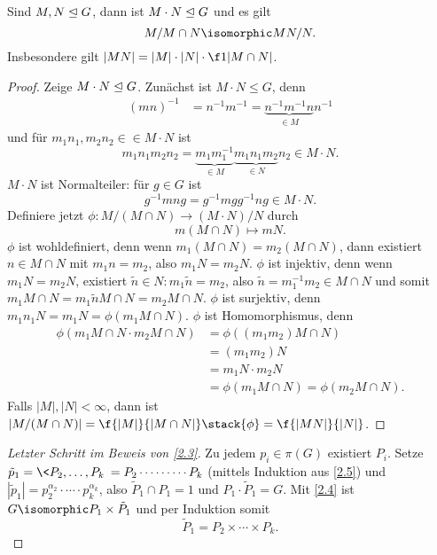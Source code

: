 \begin{lem} \label{2.5}
	Sind $M, N \trianglelefteq G$, dann ist $M\cdot N \trianglelefteq G$ und es gilt
	\[
		M / M\cap N
		\isomorphic
		MN / N.
	\]
	Insbesondere gilt $|MN| = |M|\cdot|N| \cdot \f 1{|M \cap N|}$.
	\begin{proof}
		Zeige $M\cdot N \trianglelefteq G$.
		Zunächst ist $M \cdot N \le G$, denn
		\begin{align*}
			(mn)^{-1} &= n^{-1} m^{-1}
			= \underbrace{n^{-1}m^{-1}n}_{\in M} n^{-1}
		\end{align*}
		und für $m_1n_1, m_2n_2 \in \in M\cdot N$ ist
		\[
			m_1 n_1 m_2 n_2
			= \underbrace{m_1 m_1^{-1}}_{\in M} \underbrace{m_1 n_1 m_2}_{\in N} n_2
			\in M \cdot N.
		\]
		$M \cdot N$ ist Normalteiler:
		für $g \in G$ ist
		\[
			g^{-1} mn g
			= g^{-1} m g g^{-1} n g
			\in M \cdot N.
		\]
		Definiere jetzt $\phi: M / (M \cap N) \to (M \cdot N) / N$ durch
		\[
			m(M\cap N) \mapsto mN.
		\]
		$\phi$ ist wohldefiniert, denn wenn $m_1 (M \cap N) = m_2 (M \cap N)$, dann existiert $n \in M \cap N$ mit $m_1 n = m_2$, also $m_1 N = m_2 N$.
		$\phi$ ist injektiv, denn wenn $m_1 N = m_2 N$, existiert $\tilde n \in N: m_1 \tilde n = m_2$, also $\tilde n = m_1^{-1} m_2 \in M \cap N$ und somit $m_1 M\cap N = m_1 \tilde n M\cap N = m_2 M \cap N$.
		$\phi$ ist surjektiv, denn $m_1 n_1 N = m_1 N = \phi(m_1 M\cap N)$.
		$\phi$ ist Homomorphismus, denn
		\begin{align*}
			\phi(m_1 M\cap N \cdot m_2 M \cap N)
			&= \phi((m_1m_2)M\cap N) \\
			&= (m_1 m_2) N \\
			&= m_1N \cdot m_2 N \\
			&= \phi(m_1 M\cap N)
			= \phi(m_2 M\cap N).
		\end{align*}
		Falls $|M|, |N| < \infty$, dann ist $|M / (M\cap N) | = \f {|M|}{|M\cap N|} \stack{\phi}= \f {|MN|}{|N|}$.
	\end{proof}
\end{lem}

\begin{proof}[Letzter Schritt im Beweis von \ref{2.3}]
	Zu jedem $p_i \in \pi(G)$ existiert $P_i$.
	Setze $\tilde p_1 = \< P_2, \dotsc, P_k \> = P_2 \cdots \dotsb \cdots P_k$ (mittels Induktion aus \ref{2.5}) und $|\tilde p_1| = p_2^{\alpha_2} \cdot \dotsb \cdot p_k^{\alpha_k}$, also $\tilde P_1 \cap P_1 = 1$ und $P_1 \cdot \tilde P_1 = G$.
	Mit \ref{2.4} ist $G \isomorphic P_1 \times \tilde P_1$ und per Induktion somit
	\[
		\tilde P_1 = P_2 \times \dotsb \times P_k.
	\]
\end{proof}

